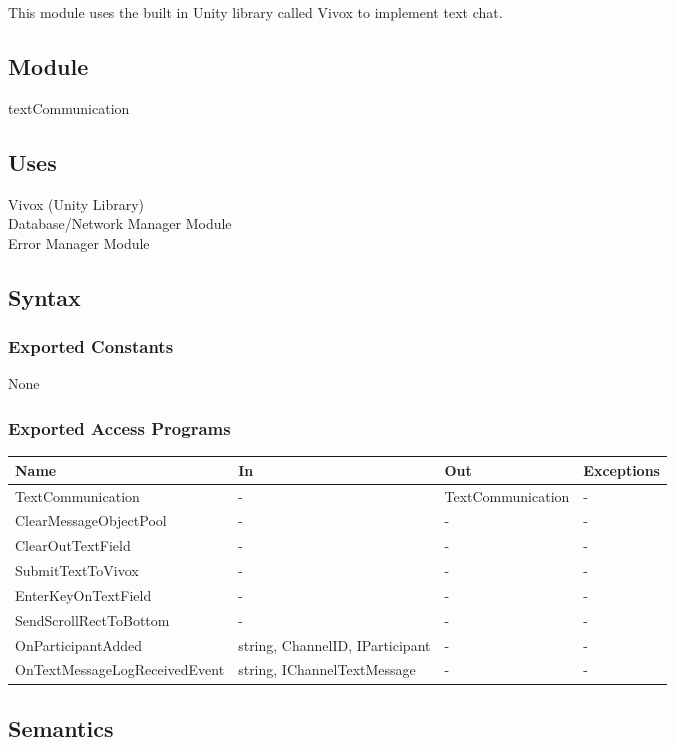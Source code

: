 \documentclass[12pt, titlepage]{article}
\begin{document}
  This module uses the built in Unity library called Vivox to implement text chat.


\subsection{Module}
textCommunication

\subsection{Uses}
Vivox (Unity Library)\\
Database/Network Manager Module\\
Error Manager Module

\subsection{Syntax}

\subsubsection{Exported Constants}
None

\subsubsection{Exported Access Programs}

\begin{center}
\begin{tabular}{p{6cm} p{4cm} p{4cm} p{2cm}}
\hline
\textbf{Name} & \textbf{In} & \textbf{Out} & \textbf{Exceptions} \\
\hline
TextCommunication & - & TextCommunication & - \\
ClearMessageObjectPool & - & - & - \\
ClearOutTextField & - & - & - \\
SubmitTextToVivox & - & - & - \\
EnterKeyOnTextField & - & - & - \\
SendScrollRectToBottom & - & - & - \\
OnParticipantAdded & string, ChannelID, IParticipant & - & - \\
OnTextMessageLogReceivedEvent & string, IChannelTextMessage & - & - \\
\hline
\end{tabular}
\end{center}

\subsection{Semantics}
\end{document}
